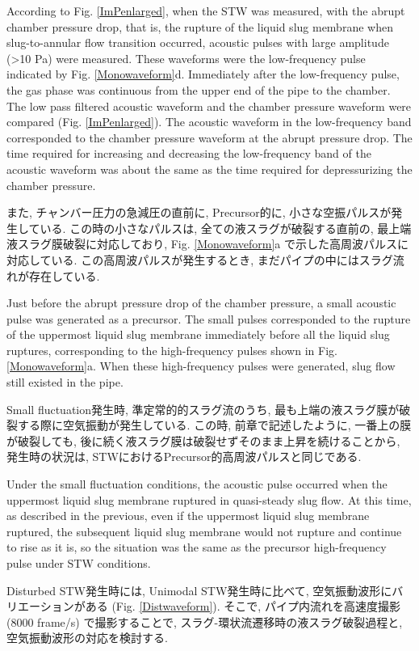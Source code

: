 \documentclass[12pt]{article}
\begin{document}
According to Fig. \ref{ImPenlarged}, when the STW was measured, with the abrupt chamber pressure drop, that is, the rupture of the liquid slug membrane when slug-to-annular flow transition occurred, acoustic pulses with large amplitude (>10 Pa) were measured.
These waveforms were the low-frequency pulse indicated by Fig. \ref{Monowaveform}d.
Immediately after the low-frequency pulse, the gas phase was continuous from the upper end of the pipe to the chamber.
The low pass filtered acoustic waveform and the chamber pressure waveform were compared (Fig. \ref{ImPenlarged}).
The acoustic waveform in the low-frequency band corresponded to the chamber pressure waveform at the abrupt pressure drop.
The time required for increasing and decreasing the low-frequency band of the acoustic waveform was about the same as the time required for depressurizing the chamber pressure.

また, チャンバー圧力の急減圧の直前に, Precursor的に, 小さな空振パルスが発生している. 
この時の小さなパルスは, 全ての液スラグが破裂する直前の, 最上端液スラグ膜破裂に対応しており, Fig. \ref{Monowaveform}a で示した高周波パルスに対応している. この高周波パルスが発生するとき, まだパイプの中にはスラグ流れが存在している. 

Just before the abrupt pressure drop of the chamber pressure, a small acoustic pulse was generated as a precursor.
The small pulses corresponded to the rupture of the uppermost liquid slug membrane immediately before all the liquid slug ruptures, corresponding to the high-frequency pulses shown in Fig. \ref{Monowaveform}a.
When these high-frequency pulses were generated, slug flow still existed in the pipe.

Small fluctuation発生時, 準定常的的スラグ流のうち, 最も上端の液スラグ膜が破裂する際に空気振動が発生している. この時, 前章で記述したように, 一番上の膜が破裂しても, 後に続く液スラグ膜は破裂せずそのまま上昇を続けることから, 発生時の状況は, STWにおけるPrecursor的高周波パルスと同じである.

Under the small fluctuation conditions, the acoustic pulse occurred when the uppermost liquid slug membrane ruptured in quasi-steady slug flow. 
At this time, as described in the previous, even if the uppermost liquid slug membrane ruptured, the subsequent liquid slug membrane would not rupture and continue to rise as it is, so the situation was the same as the precursor high-frequency pulse under STW conditions.

Disturbed STW発生時には, Unimodal STW発生時に比べて, 空気振動波形にバリエーションがある (Fig. \ref{Distwaveform}). 
そこで, パイプ内流れを高速度撮影 (8000 frame/s) で撮影することで, スラグ-環状流遷移時の液スラグ破裂過程と, 空気振動波形の対応を検討する.
\end{document}
